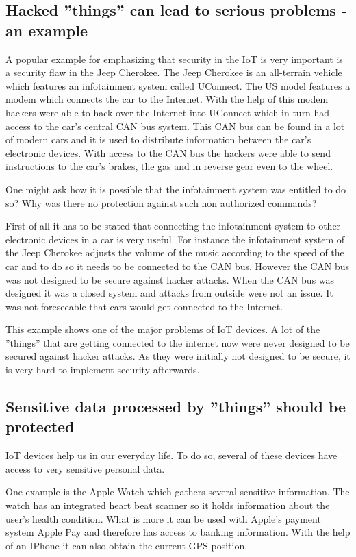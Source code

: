 \documentclass[conference]{IEEEtran}
\begin{document}
\subsection{Hacked ''things'' can lead to serious problems - an example}
A popular example for emphasizing that security in the IoT is very important is 
a security flaw in the Jeep Cherokee. The Jeep Cherokee is an all-terrain 
vehicle which features an infotainment system called UConnect. The US model 
features a modem which connects the car to the Internet. With the help of this 
modem hackers were able to hack over the Internet into UConnect which in turn 
had access to the car's central CAN bus system. This CAN bus can be found in a 
lot of modern cars and it is used to distribute information between the car's 
electronic devices. With access to the CAN bus the hackers were able to send 
instructions to the car's brakes, the gas and in reverse gear even to the 
wheel. \cite{ctArticle}

One might ask how it is possible that the infotainment system was entitled to 
do so? Why was there no protection against such non authorized commands?

First of all it has to be stated that connecting the infotainment system to 
other electronic devices in a car is very useful. For instance the 
infotainment system of the Jeep Cherokee adjusts the volume of the music 
according to the speed of the car and to do so it needs to be connected to the 
CAN bus. However the CAN bus was not designed to be secure against hacker 
attacks. When the CAN bus was designed it was a closed system and attacks from 
outside were not an issue. It was not foreseeable that cars would get connected 
to the Internet.

This example shows one of the major problems of IoT devices. A lot of the 
''things'' that are getting connected to the internet now were never designed 
to be secured against hacker attacks. As they were initially not designed to be 
secure, it is very hard to implement security afterwards.

\subsection{Sensitive data processed by ''things'' should be protected}
IoT devices help us in our everyday life. To do so, several of these 
devices have access to very sensitive personal data. 

One example is the Apple Watch which gathers several sensitive information. The 
watch has an integrated heart beat scanner so it holds information about the 
user's health condition. What is more it can be used with Apple's payment 
system Apple Pay and therefore has access to banking information. With the help 
of an IPhone it can also obtain the current GPS position. 
\end{document}

